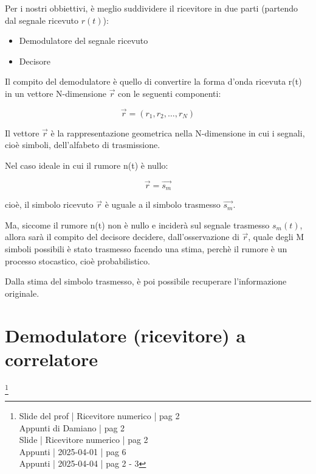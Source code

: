 Per i nostri obbiettivi, è meglio suddividere il ricevitore in due parti (partendo dal segnale ricevuto $r(t)$): 

\begin{itemize}
    \item Demodulatore del segnale ricevuto 
    \item Decisore
\end{itemize}

Il compito del demodulatore è quello di convertire la forma d'onda ricevuta r(t) in un vettore N-dimensione $\overrightarrow{r}$ con le seguenti componenti: 

{
    \Large 
    \begin{equation}
        \overrightarrow{r} = (r_1, r_2, \dots, r_N)
    \end{equation}
}

Il vettore $\overrightarrow{r}$ è la rappresentazione geometrica nella N-dimensione in cui i segnali, cioè simboli, 
dell'alfabeto di trasmissione. \newline 

Nel caso ideale in cui il rumore n(t) è nullo: 

{
    \Large 
    \begin{equation}
        \overrightarrow{r} = \overrightarrow{s_m}
    \end{equation}
}

cioè, il simbolo ricevuto $\overrightarrow{r}$ è uguale a il simbolo trasmesso $\overrightarrow{s_m}$. \newline 

Ma, siccome il rumore n(t) non è nullo e inciderà sul segnale trasmesso $s_m (t)$, 
allora sarà il compito del decisore decidere, dall'osservazione di $\overrightarrow{r}$, 
quale degli M simboli possibili è stato trasmesso facendo una stima, perchè il rumore è un processo stocastico, cioè probabilistico. \newline 

Dalla stima del simbolo trasmesso, 
è poi possibile recuperare l'informazione originale. \newline 

\newpage 

\section{Demodulatore (ricevitore) a correlatore}
\footnote{Slide del prof | Ricevitore numerico | pag 2 \\  
Appunti di Damiano | pag 2 \\
Slide | Ricevitore numerico | pag 2 \\
Appunti | 2025-04-01 | pag 6 \\
Appunti | 2025-04-04 | pag 2 - 3
}

